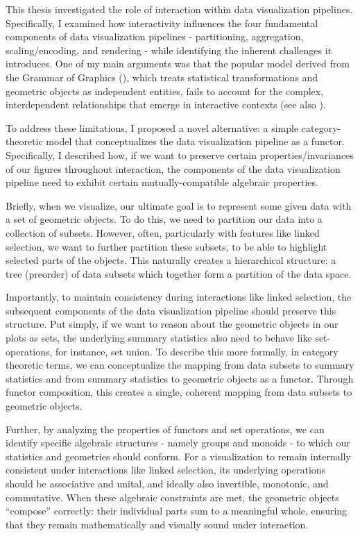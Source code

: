 \documentclass[
  openany]{book}
\theoremstyle{definition}
\theoremstyle{definition}
\theoremstyle{definition}
\theoremstyle{definition}
\theoremstyle{remark}
\begin{document}
This thesis investigated the role of interaction within data visualization pipelines. Specifically, I examined how interactivity influences the four fundamental components of data visualization pipelines - partitioning, aggregation, scaling/encoding, and rendering - while identifying the inherent challenges it introduces. One of my main arguments was that the popular model derived from the Grammar of Graphics (), which treats statistical transformations and geometric objects as independent entities, fails to account for the complex, interdependent relationships that emerge in interactive contexts (see also ).

To address these limitations, I proposed a novel alternative: a simple category-theoretic model that conceptualizes the data visualization pipeline as a functor. Specifically, I described how, if we want to preserve certain properties/invariances of our figures throughout interaction, the components of the data visualization pipeline need to exhibit certain mutually-compatible algebraic properties.

Briefly, when we visualize, our ultimate goal is to represent some given data with a set of geometric objects. To do this, we need to partition our data into a collection of subsets. However, often, particularly with features like linked selection, we want to further partition these subsets, to be able to highlight selected parts of the objects. This naturally creates a hierarchical structure: a tree (preorder) of data subsets which together form a partition of the data space.

Importantly, to maintain consistency during interactions like linked selection, the subsequent components of the data visualization pipeline should preserve this structure. Put simply, if we want to reason about the geometric objects in our plots as sets, the underlying summary statistics also need to behave like set-operations, for instance, set union. To describe this more formally, in category theoretic terms, we can conceptualize the mapping from data subsets to summary statistics and from summary statistics to geometric objects as a functor. Through functor composition, this creates a single, coherent mapping from data subsets to geometric objects.

Further, by analyzing the properties of functors and set operations, we can identify specific algebraic structures - namely groups and monoids - to which our statistics and geometries should conform. For a visualization to remain internally consistent under interactions like linked selection, its underlying operations should be associative and unital, and ideally also invertible, monotonic, and commutative. When these algebraic constraints are met, the geometric objects ``compose'' correctly: their individual parts sum to a meaningful whole, ensuring that they remain mathematically and visually sound under interaction.
\end{document}
